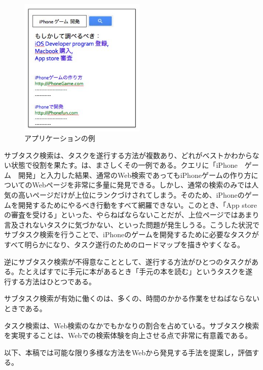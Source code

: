 \documentclass[submit,techreq]{ipsj}
\begin{document}
\begin{figure}[tb]
\includegraphics[width=6cm, bb=0 0 240 400]{future_app.jpg}
\caption{アプリケーションの例}
\label{fig:future_app}
\end{figure}

サブタスク検索は、タスクを遂行する方法が複数あり、どれがベストかわからない状態で役割を果たす。は、まさしくその一例である。クエリに「iPhone　ゲーム　開発」と入力した結果、通常のWeb検索であってもiPhoneゲームの作り方についてのWebページを非常に多量に発見できる。しかし、通常の検索のみでは人気の高いページだけが上位にランクづけされてしまう。そのため、iPhoneのゲームを開発するためにやるべき行動をすべて網羅できない。このとき、「App storeの審査を受ける」といった、やらねばならないことだが、上位ページではあまり言及されないタスクに気づかない、といった問題が発生しうる。こうした状況でサブタスク検索を行うことで、iPhoneのゲームを開発するために必要なタスクがすべて明らかになり、タスク遂行のためのロードマップを描きやすくなる。

逆にサブタスク検索が不得意なこととして、遂行する方法がひとつのタスクがある。たとえばすでに手元に本があるとき「手元の本を読む」というタスクを遂行する方法はひとつである。

サブタスク検索が有効に働くのは、多くの、時間のかかる作業をせねばならないときである。


タスク検索は、Web検索のなかでもかなりの割合を占めている。サブタスク検索を実現することは、Webでの検索体験を向上させる点で非常に有意義である。

以下、本稿では可能な限り多様な方法をWebから発見する手法を提案し，評価する。


\end{document}
